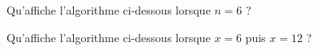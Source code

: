 \begin{multicols}{2}
    \algoname{}
    Qu'affiche l'algorithme ci-dessous lorsque $n=6$ ?
    \bigskip
    \begin{algo}
    \end{algo}

    \switchcol

    \algoname{}
    Qu'affiche l'algorithme ci-dessous lorsque $x=6$ puis $x=12$ ?
    \bigskip
    \begin{algo}
    \end{algo}
\end{multicols}